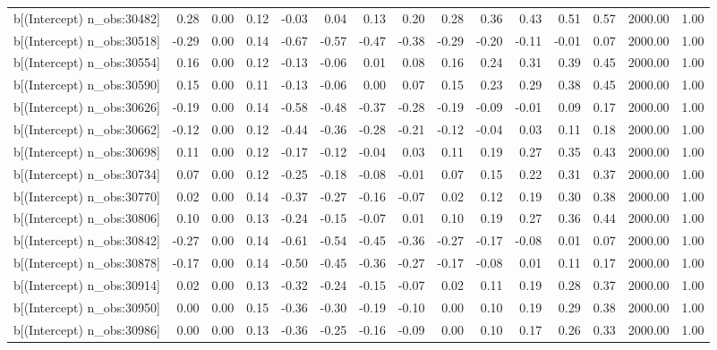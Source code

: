 \begin{table}[ht]
\begin{tabular}{rrrrrrrrrrrrrrr}
  b[(Intercept) n\_obs:30482] & 0.28 & 0.00 & 0.12 & -0.03 & 0.04 & 0.13 & 0.20 & 0.28 & 0.36 & 0.43 & 0.51 & 0.57 & 2000.00 & 1.00 \\ 
  b[(Intercept) n\_obs:30518] & -0.29 & 0.00 & 0.14 & -0.67 & -0.57 & -0.47 & -0.38 & -0.29 & -0.20 & -0.11 & -0.01 & 0.07 & 2000.00 & 1.00 \\ 
  b[(Intercept) n\_obs:30554] & 0.16 & 0.00 & 0.12 & -0.13 & -0.06 & 0.01 & 0.08 & 0.16 & 0.24 & 0.31 & 0.39 & 0.45 & 2000.00 & 1.00 \\ 
  b[(Intercept) n\_obs:30590] & 0.15 & 0.00 & 0.11 & -0.13 & -0.06 & 0.00 & 0.07 & 0.15 & 0.23 & 0.29 & 0.38 & 0.45 & 2000.00 & 1.00 \\ 
  b[(Intercept) n\_obs:30626] & -0.19 & 0.00 & 0.14 & -0.58 & -0.48 & -0.37 & -0.28 & -0.19 & -0.09 & -0.01 & 0.09 & 0.17 & 2000.00 & 1.00 \\ 
  b[(Intercept) n\_obs:30662] & -0.12 & 0.00 & 0.12 & -0.44 & -0.36 & -0.28 & -0.21 & -0.12 & -0.04 & 0.03 & 0.11 & 0.18 & 2000.00 & 1.00 \\ 
  b[(Intercept) n\_obs:30698] & 0.11 & 0.00 & 0.12 & -0.17 & -0.12 & -0.04 & 0.03 & 0.11 & 0.19 & 0.27 & 0.35 & 0.43 & 2000.00 & 1.00 \\ 
  b[(Intercept) n\_obs:30734] & 0.07 & 0.00 & 0.12 & -0.25 & -0.18 & -0.08 & -0.01 & 0.07 & 0.15 & 0.22 & 0.31 & 0.37 & 2000.00 & 1.00 \\ 
  b[(Intercept) n\_obs:30770] & 0.02 & 0.00 & 0.14 & -0.37 & -0.27 & -0.16 & -0.07 & 0.02 & 0.12 & 0.19 & 0.30 & 0.38 & 2000.00 & 1.00 \\ 
  b[(Intercept) n\_obs:30806] & 0.10 & 0.00 & 0.13 & -0.24 & -0.15 & -0.07 & 0.01 & 0.10 & 0.19 & 0.27 & 0.36 & 0.44 & 2000.00 & 1.00 \\ 
  b[(Intercept) n\_obs:30842] & -0.27 & 0.00 & 0.14 & -0.61 & -0.54 & -0.45 & -0.36 & -0.27 & -0.17 & -0.08 & 0.01 & 0.07 & 2000.00 & 1.00 \\ 
  b[(Intercept) n\_obs:30878] & -0.17 & 0.00 & 0.14 & -0.50 & -0.45 & -0.36 & -0.27 & -0.17 & -0.08 & 0.01 & 0.11 & 0.17 & 2000.00 & 1.00 \\ 
  b[(Intercept) n\_obs:30914] & 0.02 & 0.00 & 0.13 & -0.32 & -0.24 & -0.15 & -0.07 & 0.02 & 0.11 & 0.19 & 0.28 & 0.37 & 2000.00 & 1.00 \\ 
  b[(Intercept) n\_obs:30950] & 0.00 & 0.00 & 0.15 & -0.36 & -0.30 & -0.19 & -0.10 & 0.00 & 0.10 & 0.19 & 0.29 & 0.38 & 2000.00 & 1.00 \\ 
  b[(Intercept) n\_obs:30986] & 0.00 & 0.00 & 0.13 & -0.36 & -0.25 & -0.16 & -0.09 & 0.00 & 0.10 & 0.17 & 0.26 & 0.33 & 2000.00 & 1.00 \\ 

\end{tabular}
\end{table}
